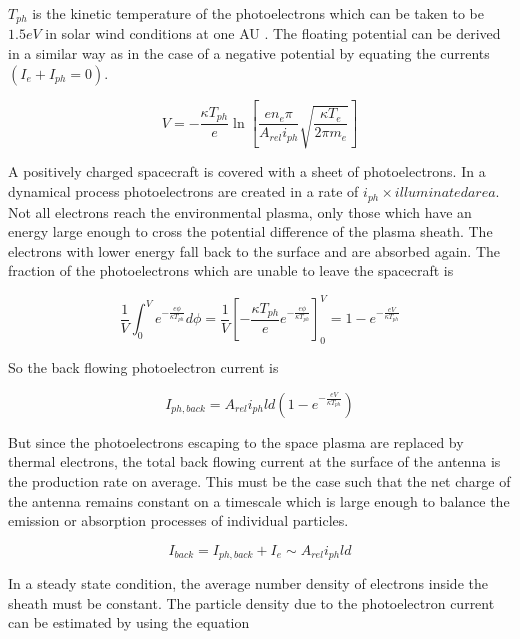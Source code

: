 \documentclass[a4paper,11pt]{thesis}
\begin{document}
$T_{ph}$ is the kinetic temperature of the photoelectrons which can be taken to be $1.5eV$ in solar wind conditions at one AU \cite{grard73}. The floating potential can be derived in a similar way as in the case of a negative potential by equating the currents $(I_e+I_{ph}=0)$.

\begin{equation}\label{eq:volt_positive_sc}
 V=-\frac{\kappa T_{ph}}{e}\ln{\left[\frac{en_e \pi}{A_{rel} i_{ph}} \sqrt{\frac{\kappa T_e}{2\pi m_e}}\right]}
\end{equation}

A positively charged spacecraft is covered with a sheet of photoelectrons. In a dynamical process photoelectrons are created in a rate of $i_{ph}\times illuminated area$. Not all electrons reach the environmental plasma, only those which have an energy large enough to cross the potential difference of the plasma sheath. The electrons with lower energy fall back to the surface and are absorbed again. The fraction of the photoelectrons which are unable to leave the spacecraft is


\begin{equation}
\frac{1}{ V } \int_0^V e^{-\frac{e\phi}{\kappa T_{ph}}} d\phi=\frac{1}{ V }\left[ -\frac{\kappa T_{ph}}{e}e^{-\frac{e\phi }{\kappa T_{ph}}}\right]_0^V=1-e^{-\frac{eV}{\kappa T_{ph}}}
\end{equation}

So the back flowing photoelectron current is

\begin{equation}
I_{ph,back} = A_{rel} i_{ph}ld (1-e^{-\frac{eV}{\kappa T_{ph}}})
\end{equation}

But since the photoelectrons escaping to the space plasma are replaced by thermal electrons, the total back flowing current at the surface of the antenna is the production rate on average. This must be the case such that the net charge of the antenna remains constant on a timescale which is large enough to balance the emission or absorption processes of individual particles.

\begin{equation}
I_{back} = I_{ph,back}+I_e \sim A_{rel} i_{ph}ld
\end{equation}


In a steady state condition, the average number density of electrons inside the sheath must be constant. The particle density due to the photoelectron current can be estimated by using the equation
\end{document}
